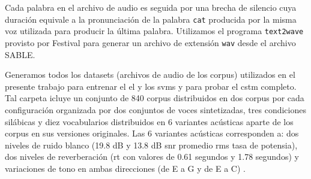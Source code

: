 Cada palabra en el archivo de audio es seguida por una brecha de silencio cuya duración equivale a la pronunciación de la palabra \texttt{cat} producida por la misma voz utilizada para producir la última palabra. Utilizamos el programa \texttt{text2wave} provisto por Festival para generar un archivo de extensión \texttt{wav} desde el archivo SABLE.

Generamos todos los datasets (archivos de audio de los corpus) utilizados en el presente trabajo para entrenar el \gls{el} y los \glspl{svm} y para probar el \gls{cstm} completo. Tal carpeta icluye un conjunto de 840 corpus distribuidos en dos corpus por cada configuración organizada por dos conjuntos de voces sintetizadas, tres condiciones silábicas y diez vocabularios distribuidos en 6 variantes acústicas aparte de los corpus en sus versiones originales. Las 6 variantes acústicas corresponden a: dos niveles de ruido blanco (19.8 dB y 13.8 dB \gls{snr} promedio \gls{rms} tasa de potensia), dos niveles de reverberación (\gls{rt} con valores de 0.61 segundos y 1.78 segundos) y variaciones de tono en ambas direcciones (de E a G y de E a C) \cite{dematties_dario_2019_2576130}.











